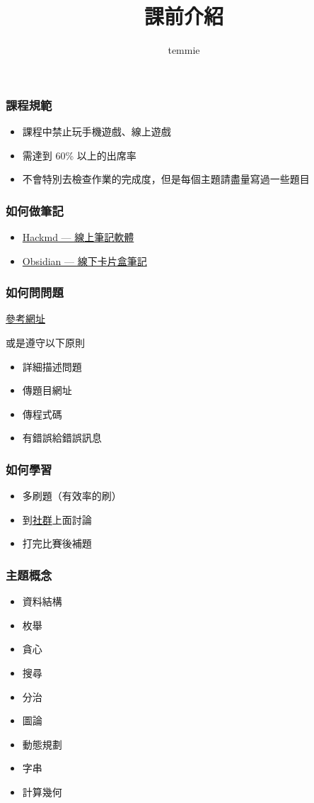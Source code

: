 \documentclass{beamer}
\title{課前介紹}
\author{temmie}
\date{}
\begin{document}
\frame{\titlepage}

\begin{frame}
\frametitle{課程規範}
    \begin{itemize}
        \item 課程中禁止玩手機遊戲、線上遊戲
        \item 需達到 60\% 以上的出席率
        \item 不會特別去檢查作業的完成度，但是每個主題請盡量寫過一些題目
    \end{itemize}
\end{frame}

\begin{frame}
\frametitle{如何做筆記}
    \begin{itemize}
        \item \href{https://hackmd.io/?nav=overview}{Hackmd — 線上筆記軟體}
        \item \href{https://youtu.be/Egj_DdGUIDI}{Obsidian — 線下卡片盒筆記}
    \end{itemize}
\end{frame}

\begin{frame}
\frametitle{如何問問題}
    \href{https://github.com/ryanhanwu/How-To-Ask-Questions-The-Smart-Way}{參考網址}
    
    \vspace{0.5cm}
    或是遵守以下原則
    \begin{itemize}
        \item 詳細描述問題
        \item 傳題目網址
        \item 傳程式碼
        \item 有錯誤給錯誤訊息
    \end{itemize}
\end{frame}

\begin{frame}
\frametitle{如何學習}
    \begin{itemize}
        \item 多刷題（有效率的刷）
        \item 到\href{https://discord.gg/cisc}{社群}上面討論
        \item 打完比賽後補題
    \end{itemize}
\end{frame}

\begin{frame}
\frametitle{主題概念}
    \begin{itemize}
        \item 資料結構
        \item 枚舉
        \item 貪心
        \item 搜尋
        \item 分治
        \item 圖論
        \item 動態規劃
        \item 字串
        \item 計算幾何
    \end{itemize}

    \vspace{0.5cm}
\end{frame}
\end{document}

